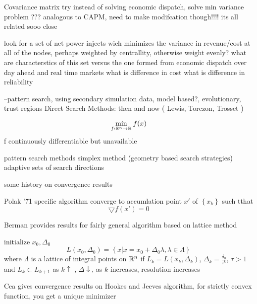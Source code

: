 Covariance matrix
try instead of solving economic dispatch, solve min variance problem ??? analogous to CAPM, need to make modifcation though!!!! its all related sooo close


look for a set of net power injects wich minimizes the variance in revenue/cost at all of the nodes, perhaps weighted by centrallity, otherwise weight evenly?
what are characterstics of this set versus the one formed from economic dispatch over day ahead and real time markets
what is difference in cost
what is difference in reliability













--pattern search, using secondary simulation data, model based?, evolutionary, trust regions
Direct Search Methods: then and now ( Lewis, Torczon, Trosset ) \cite{lewis_2000}

\begin{equation}
\min_{ f: \mathbb{R}^{n} \rightarrow \mathbb{R}^{}} f(x)
\end{equation}
f continuously differentiable but unavailable

pattern search methods
simplex method (geometry based search strategies)
adaptive sets of search directions

some history on convergence results

Polak '71 specific algorithm converge to accumlation point $x'$ of $\left\{x_k\right\}$ such tthat 
\begin{equation}
\bigtriangledown f(x') = 0
\end{equation}

Berman provides results for fairly general algorithm based on lattice method

initialize 
$x_0, \Delta_0$
\begin{equation}
L(x_0, \Delta_0) = \left\{ x | x = x_0 + \Delta_0 \lambda, \lambda \in \Lambda \right\}
\end{equation}
where $\Lambda $ is a lattice of integral points on $\mathbb{R}^{n}$
if $L_k  = L(x_k, \Delta_k)$, $\Delta_k = \frac{\delta_0}{\tau^k}$, $\tau > 1$ and $L_k \subset L_{k+1}$
as $k \uparrow$ , $\Delta \downarrow$, as $k$ increases, resolution increases

Cea gives convergence results on Hookes and Jeeves algorithm, for strictly convex function, you get a unique minimizer

